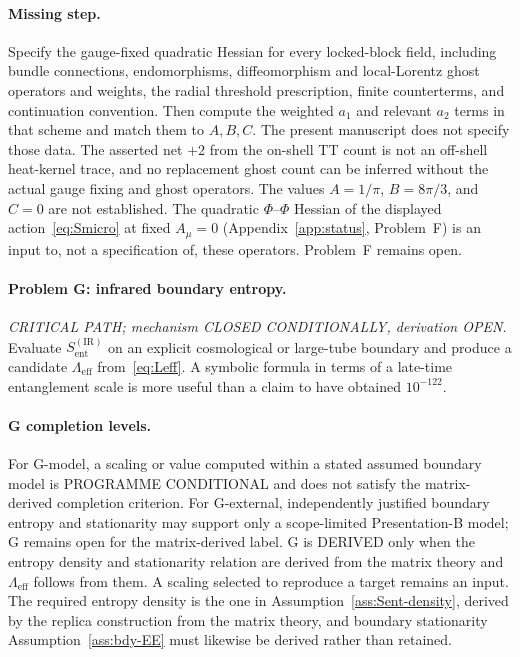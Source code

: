 \paragraph{Missing step.}
Specify the gauge-fixed quadratic Hessian for every locked-block
field, including bundle connections, endomorphisms, diffeomorphism
and local-Lorentz ghost operators and weights, the radial threshold
prescription, finite counterterms, and continuation convention. Then
compute the weighted \(a_1\) and relevant \(a_2\) terms in that scheme
and match them to \(A,B,C\). The present manuscript does not specify
those data. The asserted net \(+2\) from the on-shell TT count is not
an off-shell heat-kernel trace, and no replacement ghost count can be
inferred without the actual gauge fixing and ghost operators. The
values \(A=1/\pi\), \(B=8\pi/3\), and \(C=0\) are not established.
The quadratic \(\Phi\)--\(\Phi\) Hessian of the displayed
action~\eqref{eq:Smicro} at fixed \(A_\mu=0\) (Appendix~\ref{app:status},
Problem~F) is an input to, not a specification of, these operators.
Problem~F remains open.


\paragraph{Problem G: infrared boundary entropy.}
\emph{CRITICAL PATH; mechanism CLOSED CONDITIONALLY, derivation OPEN.}
Evaluate \(S_{\mathrm{ent}}^{\mathrm{(IR)}}\) on an explicit
cosmological or large-tube boundary and produce a candidate
\(\Lambda_{\mathrm{eff}}\) from~\eqref{eq:Leff}. A symbolic
formula in terms of a late-time entanglement scale is more useful
than a claim to have obtained \(10^{-122}\).

\paragraph{G completion levels.}
For G-model, a scaling or value computed within a stated assumed
boundary model is PROGRAMME CONDITIONAL and does not satisfy the
matrix-derived completion criterion. For G-external, independently
justified boundary entropy and stationarity may support only a
scope-limited Presentation-B model; G remains open for the
matrix-derived label. G is DERIVED only when the entropy density and
stationarity relation are derived from the matrix theory and
\(\Lambda_{\mathrm{eff}}\) follows from them. A scaling selected to
reproduce a target remains an input. The required entropy density is
the one in Assumption~\ref{ass:Sent-density}, derived by the replica
construction from the matrix theory, and boundary stationarity
Assumption~\ref{ass:bdy-EE} must likewise be derived rather than
retained.

